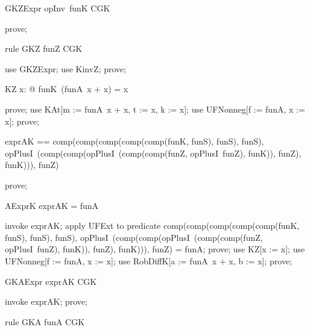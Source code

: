 \documentclass{article}
\begin{document}
\begin{theorem}{GKZExpr}
  opInv~funK \in CGK
\end{theorem}

\begin{zproof}
prove;
\end{zproof}

\begin{theorem}{rule GKZ}
  funZ \in CGK
\end{theorem}

\begin{zproof}
use GKZExpr;
use KinvZ;
prove;
\end{zproof}


\begin{theorem}{KZ}
  \forall x: \nat @ funK~(funA~x + x) = x
\end{theorem}

\begin{zproof}
prove;
use KAt[m := funA~x + x, t := x, k := x];
use UFNonneg[f := funA, x := x];
prove;
\end{zproof}

\begin{zed}
  exprAK == comp(comp(comp(comp(comp(funK, funS), funS), funS), opPlusI~(comp(comp(opPlusI~(comp(comp(funZ, opPlusI~funZ), funK)), funZ), funK))), funZ)
\end{zed}

\begin{zproof}
prove;
\end{zproof}

\begin{theorem}{AExprK}
  exprAK = funA
\end{theorem}

\begin{zproof}
invoke exprAK;
apply UFExt to predicate comp(comp(comp(comp(comp(funK, funS), funS), funS), opPlusI~(comp(comp(opPlusI~(comp(comp(funZ, opPlusI~funZ), funK)), funZ), funK))), funZ) = funA;
prove;
use KZ[x := x];
use UFNonneg[f := funA, x := x];
use RobDiffK[a := funA~x + x, b := x];
prove;
\end{zproof}

\begin{theorem}{GKAExpr}
  exprAK \in CGK
\end{theorem}

\begin{zproof}
invoke exprAK;
prove;
\end{zproof}

\begin{theorem}{rule GKA}
  funA \in CGK
\end{theorem}
\end{document}
